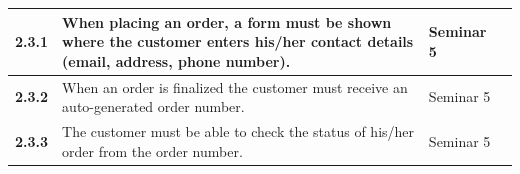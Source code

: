 \documentclass[a4paper,12pt]{article}
\begin{document}
\begin{table}[htbp]
\begin{tabular}{|l|L{8cm}|L{2.5cm}|L{2.5cm}|}
		\textbf{2.3.1} & When placing an order, a form must be shown where the customer enters his/her contact details (email, address, phone number).                      &    Seminar 5      &        \\ \hline
		\textbf{2.3.2} & When an order is finalized the customer must receive an auto-generated order number.                                                                                                          &  Seminar 5        &        \\ \hline
		\textbf{2.3.3} & The customer must be able to check the status of his/her order from the order number.                                                                                                         &   Seminar 5       &        \\ \hline
	\end{tabular}
\end{table}

\newpage
\end{document}
